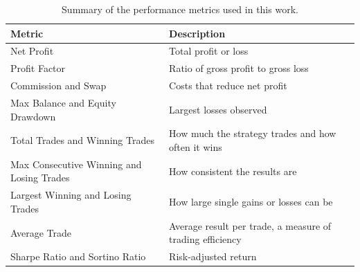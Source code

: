 \begin{table}[htb!]
\centering
\footnotesize
\caption{Summary of the performance metrics used in this work.}
\label{Tables:PerformanceMetrics}
\begin{tabularx}{\textwidth}{@{}lX@{}}
\toprule
\textbf{Metric} & \textbf{Description} \\
\midrule
Net Profit & Total profit or loss \\
\addlinespace
Profit Factor & Ratio of gross profit to gross loss \\
\addlinespace
Commission and Swap & Costs that reduce net profit \\
\addlinespace
Max Balance and Equity Drawdown & Largest losses observed \\
\addlinespace
Total Trades and Winning Trades & How much the strategy trades and how often it wins \\
\addlinespace
Max Consecutive Winning and Losing Trades & How consistent the results are \\
\addlinespace
Largest Winning and Losing Trades & How large single gains or losses can be \\
\addlinespace
Average Trade & Average result per trade, a measure of trading efficiency \\
\addlinespace
Sharpe Ratio and Sortino Ratio & Risk-adjusted return \\
\bottomrule
\end{tabularx}
\end{table}